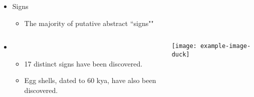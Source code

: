 \documentclass[final,hyperref={pdfpagelabels=false}]{beamer}
\begin{document}
\begin{frame}
    \begin{block}{}
        \begin{itemize}
        \item Signs
        \begin{itemize}
            \item The majority of putative abstract ``signs""
        \end{itemize}
    \end{itemize}
    \vspace*{-.8\baselineskip}
    \begin{columns}[onlytextwidth,T]
        \begin{column}{.5\textwidth}
            \begin{itemize}
                \item[]
              \begin{itemize}
                    \item 17 distinct signs have been discovered.
                    \item Egg shells, dated to 60 kya, have also been discovered.
            \end{itemize}
            \end{itemize}
        \end{column}
        \begin{column}{.33\textwidth}
             \texttt{[image: example-image-duck]}
        \end{column}
    \end{columns}
    \end{block}
\end{frame}
\end{document}
